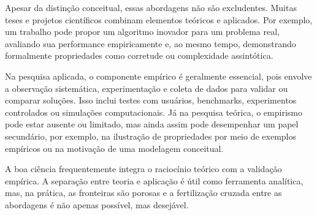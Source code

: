 Apesar da distinção conceitual, essas abordagens não são excludentes. 
Muitas teses e projetos científicos combinam elementos teóricos e aplicados. 
Por exemplo, um trabalho pode propor um algoritmo inovador para um problema real, avaliando sua performance empiricamente e, ao mesmo tempo, demonstrando formalmente propriedades como corretude ou complexidade assintótica.

Na pesquisa aplicada, o componente empírico é geralmente essencial, pois envolve a observação sistemática, experimentação e coleta de dados para validar ou comparar soluções. 
Isso inclui testes com usuários, benchmarks, experimentos controlados ou simulações computacionais. 
Já na pesquisa teórica, o empirismo pode estar ausente ou limitado, mas ainda assim pode desempenhar um papel secundário, por exemplo, na ilustração de propriedades por meio de exemplos empíricos ou na motivação de uma modelagem conceitual.

A boa ciência frequentemente integra o raciocínio teórico com a validação empírica. A separação entre teoria e aplicação é útil como ferramenta analítica, mas, na prática, as fronteiras são porosas e a fertilização cruzada entre as abordagens é não apenas possível, mas desejável.



